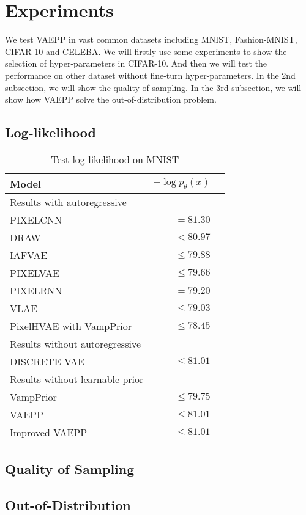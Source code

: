 \section{Experiments}
We test VAEPP in vast common datasets including MNIST, Fashion-MNIST, CIFAR-10 and CELEBA. 
We will firstly use some experiments to show the selection of hyper-parameters in CIFAR-10. And then we will test the performance on other dataset without fine-turn hyper-parameters. In the 2nd subsection, we will show the quality of sampling. In the 3rd subsection, we will show how VAEPP solve the out-of-distribution problem. 
\subsection{Log-likelihood}

\begin{table}
\centering
\begin{tabular}{lrr}  
\toprule
Model  &  $-\log p_\theta(x)$ \\
\midrule
Results with autoregressive   \\
PIXELCNN         &  $= 81.30$      \\
DRAW             &  $< 80.97$      \\
IAFVAE           &  $\leq 79.88$      \\
PIXELVAE         &  $\leq 79.66$      \\
PIXELRNN         &  $=79.20$      \\
VLAE             &  $\leq 79.03$      \\
PixelHVAE with VampPrior        &  $\leq 78.45$      \\
\midrule
Results without autoregressive   \\
DISCRETE VAE     &  $\leq 81.01$      \\
\midrule
Results without learnable prior   \\
VampPrior        &  $\leq 79.75$      \\
VAEPP            &  $\leq 81.01$      \\
Improved VAEPP   &  $\leq 81.01$      \\
\bottomrule
\end{tabular}
\caption{Test log-likelihood on MNIST}
\label{tab:mnist-nll}
\end{table}

\subsection{Quality of Sampling}


\subsection{Out-of-Distribution}


